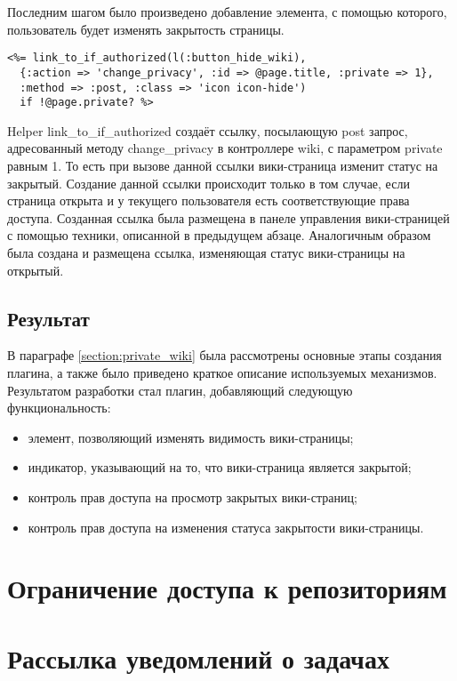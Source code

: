 Последним шагом было произведено добавление элемента, с помощью которого,
пользователь будет изменять закрытость страницы.
\small{\begin{lstlisting}
<%= link_to_if_authorized(l(:button_hide_wiki), 
  {:action => 'change_privacy', :id => @page.title, :private => 1}, 
  :method => :post, :class => 'icon icon-hide') 
  if !@page.private? %>
\end{lstlisting}}
Helper link\_to\_if\_authorized создаёт ссылку, посылающую post запрос,
адресованный методу change\_privacy в контроллере wiki, с параметром private
равным 1. То есть при вызове данной ссылки вики-страница изменит статус на
закрытый. Создание данной ссылки происходит только в том случае, если страница
открыта и у текущего пользователя есть соответствующие права доступа. Созданная
ссылка была размещена в панеле управления вики-страницей с помощью техники,
описанной в предыдущем абзаце. Аналогичным образом была создана и размещена
ссылка, изменяющая статус вики-страницы на открытый.

\subsection{Результат}
В параграфе \ref{section:private_wiki} была рассмотрены основные этапы создания
плагина, а также было приведено краткое описание используемых механизмов.
Результатом разработки стал плагин, добавляющий следующую функциональность:
\begin{itemize}
  \item элемент, позволяющий изменять видимость вики-страницы;
  \item индикатор, указывающий на то, что вики-страница является закрытой;
  \item контроль прав доступа на просмотр закрытых вики-страниц;
  \item контроль прав доступа на изменения статуса закрытости вики-страницы.
\end{itemize}

\section{Ограничение доступа к репозиториям}

\section{Рассылка уведомлений о задачах}


